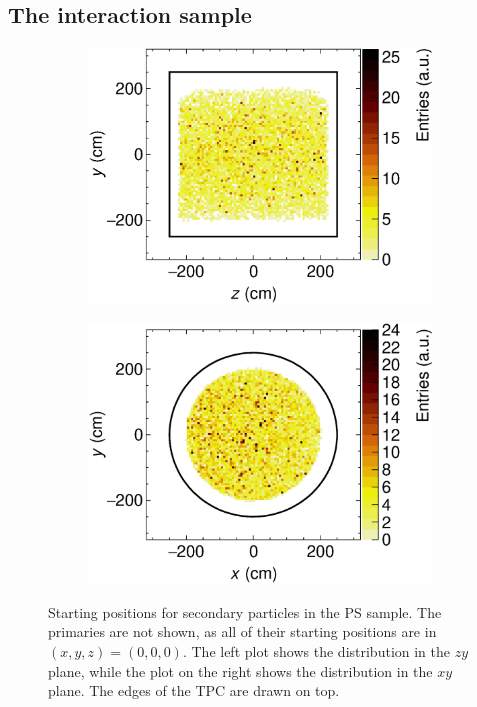 \subsection{The interaction sample}
\label{sec:interactionGAr}

\begin{figure}[t]
     \centering
     \begin{subfigure}[b]{0.48\textwidth}
         \centering
         \includegraphics[width=\textwidth]{figures/ch5-KF_NDGAr/FullSample/Int/Props/YZ_view.eps}
         \caption{}
         \label{fig:YZViewGArInt}
     \end{subfigure}
     \begin{subfigure}[b]{0.48\textwidth}
         \centering
         \includegraphics[width=\textwidth]{figures/ch5-KF_NDGAr/FullSample/Int/Props/XY_view.eps}
         \caption{}
         \label{fig:XYViewGAr_Int}
     \end{subfigure}
        \caption{Starting positions for secondary particles in the PS sample. The primaries are not shown, as all of their starting positions are in $(x,y,z)=(0,0,0)$. The left plot shows the distribution in the $zy$ plane, while the plot on the right shows the distribution in the $xy$ plane. The edges of the TPC are drawn on top. } \label{fig:ViewGArInt}
\end{figure}

